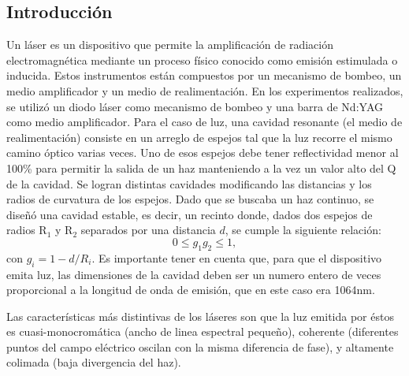\documentclass[10pt, a4paper]{article}%
\begin{document}
\begin{multicols}{2} %
\tableofcontents %

\section{Introducción}

Un láser es un dispositivo que permite la amplificación de radiación electromagnética mediante un proceso físico conocido como emisión estimulada o inducida. Estos instrumentos están compuestos por un mecanismo de bombeo, un medio amplificador y un medio de realimentación. En los experimentos realizados, se utilizó un diodo láser como mecanismo de bombeo y una barra de Nd:YAG como medio amplificador. Para el caso de luz, una cavidad resonante (el medio de realimentación) consiste en un arreglo de espejos tal que la luz recorre el mismo camino óptico varias veces. Uno de esos espejos debe tener reflectividad menor al 100\% para permitir la salida de un haz manteniendo a la vez un valor alto del Q de la cavidad. Se logran distintas cavidades modificando las distancias y los radios de curvatura de los espejos. Dado que se buscaba un haz continuo, se diseñó una cavidad estable, es decir, un recinto donde, dados dos espejos de radios R$_1$ y R$_2$ separados por una distancia $d$, se cumple la siguiente relación:
\begin{equation}
    0 \leq g_1 g_2 \leq 1,
\end{equation}
con $g_i = 1 - d/R_i$. Es importante tener en cuenta que, para que el dispositivo emita luz, las dimensiones de la cavidad deben ser un numero entero de veces proporcional a la longitud de onda de emisión, que en este caso era 1064nm.

Las características más distintivas de los láseres son que la luz emitida por éstos es cuasi-monocromática (ancho de linea espectral pequeño), coherente (diferentes puntos del campo eléctrico oscilan con la misma diferencia de fase), y altamente colimada (baja divergencia del haz).



\end{multicols}
\end{document}
